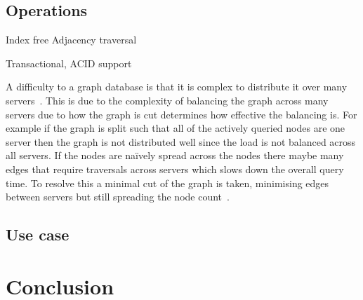 \documentclass{CRPITStyle}
\renewcommand{\cite}{\citep}
\begin{document}
\cite{sql_nosql}

\cite{sql_nosql}

\cite{sql_nosql}

\subsection{Operations}

Index free Adjacency  traversal~\cite{type_nosql}

Transactional, ACID support~\cite{type_nosql}

A difficulty to a graph database is that it is complex
to distribute it over many servers~\cite{sql_nosql}.
This is due to the complexity of balancing the
graph across many servers due to how the graph is
cut determines how effective the balancing is.
For example if the graph is split such that all of the
actively queried nodes are one server then the graph is
not distributed well since the load is not balanced across
all servers. If the nodes are naïvely spread across the nodes
there maybe many edges that require traversals across servers
which slows down the overall query time.
To resolve this a minimal cut of the graph is taken, minimising edges
between servers but still spreading the node count~\cite{neo4j}.

\subsection{Use case}




\cite{nosql_performance}

\section{Conclusion}




\end{document}
